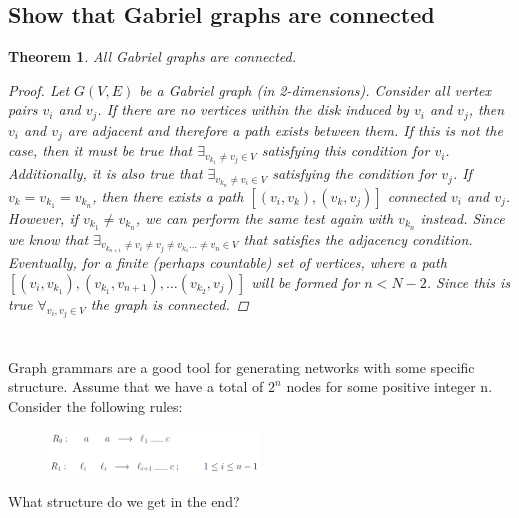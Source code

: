 \documentclass[]{article}
\numberwithin{equation}{section}
\newtheorem{theorem}{Theorem}
\begin{document}
\subsection{Show that Gabriel graphs are connected}
\begin{theorem}
    All Gabriel graphs are connected. 
    \begin{proof}
        Let $G(V,E)$ be a Gabriel graph (in 2-dimensions). 
        Consider all vertex pairs $v_i$ and $v_j$. 
        If there are no vertices within the disk induced by $v_i$ and $v_j$, then $v_i$ and $v_j$ are adjacent and therefore a path exists between them. 
        If this is not the case, then it must be true that $\exists_{v_{k_1} \neq v_j \in V}$ satisfying this condition for $v_i$. Additionally, it is also true that $\exists_{v_{k_n} \neq v_i \in V}$ satisfying the condition for $v_j$. 
        If $v_k = v_{k_1} = v_{k_n}$, then there exists a path $[(v_i, v_k), (v_k, v_j)]$ connected $v_i$ and $v_j$.
        However, if $v_{k_1} \neq v_{k_n}$, we can perform the same test again with $v_{k_n}$ instead. 
        Since we know that $\exists_{v_{k_{n+1}} \neq v_i \neq v_j \neq v_{k_{1}} \dots \neq v_{n} \in V}$ that satisfies the adjacency condition.
        Eventually, for a finite (perhaps countable) set of vertices, where a path $[(v_i, v_{k_1}), (v_{k_1}, v_{n+1}), \dots (v_{k_{2}}, v_{j})]$ will be formed for $n < N-2$.
        Since this is true $\forall_{v_i, v_j \in V}$ the graph is connected.
    \end{proof}
\end{theorem}

\newpage
\section{}
Graph grammars are a good tool for generating networks with some specific structure.
Assume that we have a total of $2^n$ nodes for some positive integer n. 
Consider the following rules:
\begin{figure}[h]
    \centering
    \includegraphics[width=0.5\textwidth]{figs/pblm6_rules.png}
\end{figure}

What structure do we get in the end?

\end{document}
